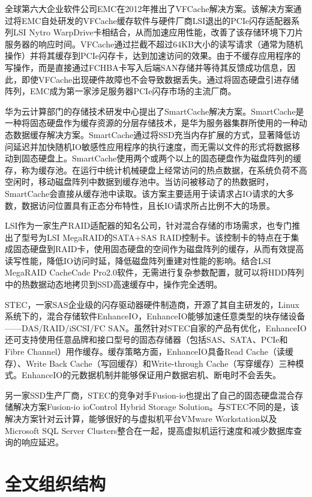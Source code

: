 全球第六大企业软件公司EMC在2012年推出了VFCache解决方案\cite{vfcache}。该解决方案通过将EMC自处研发的VFCache缓存软件与硬件厂商LSI退出的PCIe闪存适配器系列LSI Nytro WarpDrive卡相结合，从而加速应用性能，改善了该存储环境下刀片服务器的响应时间。VFCache通过拦截不超过64KB大小的读写请求（通常为随机操作）并将其缓存到PCIe闪存卡，达到加速访问的效果。由于不缓存应用程序的写操作，而是直接通过FCHBA卡写入后端SAN存储并等待其反馈成功信息，因此，即使VFCache出现硬件故障也不会导致数据丢失。通过将固态硬盘引进存储阵列，EMC成为第一家涉足服务器PCIe闪存市场的主流厂商。

华为云计算部门的存储技术研发中心提出了SmartCache解决方案\cite{smartcache}。SmartCache是一种将固态硬盘作为缓存资源的分层存储技术，是华为服务器集群所使用的一种动态数据缓存解决方案。SmartCache通过将SSD充当内存扩展的方式，显著降低访问延迟并加快随机IO敏感性应用程序的执行速度，而无需以文件的形式将数据移动到固态硬盘上。SmartCache使用两个或两个以上的固态硬盘作为磁盘阵列的缓存，称为缓存池。在运行中统计机械硬盘上经常访问的热点数据，在系统负荷不高空闲时，移动磁盘阵列中数据到缓存池中。当访问被移动了的热数据时，SmartCache会直接从缓存池中读取。该方案主要适用于读请求占IO请求的大多数，数据访问位置具有正态分布特性，且长IO请求所占比例不大的场景。

LSI作为一家生产RAID适配器的知名公司，针对混合存储的市场需求，也专门推出了型号为LSI MegaRAID的SATA+SAS RAID控制卡。该控制卡的特点在于集成固态硬盘到RAID卡，使用固态硬盘的空间作为磁盘阵列的缓存，从而有效提高读写性能，降低IO访问时延，降低磁盘阵列重建对性能的影响。结合LSI MegaRAID CacheCade Pro2.0软件\cite{lsiraidcache}，无需进行复杂参数配置，就可以将HDD阵列中的热数据动态地拷贝到SSD高速缓存中，操作完全透明。

STEC，一家SAS企业级的闪存驱动器硬件制造商，开源了其自主研发的，Linux系统下的，混合存储软件EnhanceIO\cite{enhanceio}，EnhanceIO能够加速任意类型的块存储设备——DAS/RAID/iSCSI/FC SAN。虽然针对STEC自家的产品有优化，EnhanceIO还可支持使用任意品牌和接口型号的固态存储器（包括SAS、SATA、PCIe和Fibre Channel）用作缓存。缓存策略方面，EnhanceIO具备Read Cache（读缓存）、Write Back Cache（写回缓存）和Write-through Cache（写穿缓存）三种模式。EnhanceIO的元数据机制并能够保证用户数据宕机、断电时不会丢失。

另一家SSD生产厂商，STEC的竞争对手Fusion-io也提出了自己的固态硬盘混合存储解决方案Fusion-io ioControl Hybrid Storage Solution\cite{fusionio}。与STEC不同的是，该解决方案针对云计算，能够很好的与虚拟机平台VMware Workstation以及Microsoft SQL Server Clusters整合在一起，提高虚拟机运行速度和减少数据库查询的响应延迟。

\section{全文组织结构}
\label{sec:organization}

